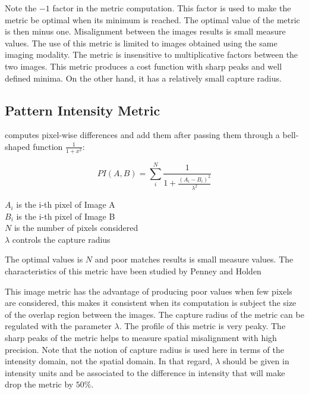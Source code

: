 Note the $-1$ factor in the metric computation. This factor is used to make the
metric be optimal when its minimum is reached.  The optimal value of the metric
is then minus one. Misalignment between the images results is small measure
values.  The use of this metric is limited to images obtained using the same
imaging modality.  The metric is insensitive to multiplicative factors between
the two images.  This metric produces a cost function with sharp peaks and well
defined minima.  On the other hand, it has a relatively small capture radius.

\subsection{Pattern Intensity Metric}
\label{sec:PatternIntensityMetric}
 computes pixel-wise differences and add them 
after passing them through a bell-shaped function $\frac{1}{1+x^2}$:

\begin{equation}
PI(A,B) =  \sum_i^N \frac{ 1 }{ 1 + \frac{ \left( A_i - B_i \right) ^ 2}{ \lambda^2 }  }
\end{equation}
\begin{center}
$A_i$ is the i-th pixel of Image A \\
$B_i$ is the i-th pixel of Image B \\
$N$ is the number of pixels considered \\
$\lambda$ controls the capture radius
\end{center}

The optimal values is $N$ and poor matches results is small measure values.
The characteristics of this metric have been studied by Penney and Holden
\cite{Holden1999}\cite{Penney1998}

This image metric has the advantage of producing poor values when few pixels
are considered, this makes it consistent when its computation is subject the
size of the overlap region between the images. The capture radius of the
metric can be regulated with the parameter $\lambda$.  The profile of this
metric is very peaky. The sharp peaks of the metric helps to measure spatial
misalignment with high precision. Note that the notion of capture radius is
used here in terms of the intensity domain, not the spatial domain. In that
regard, $\lambda$ should be given in intensity units and be associated to the
difference in intensity that will make drop the metric by $50\%$.

